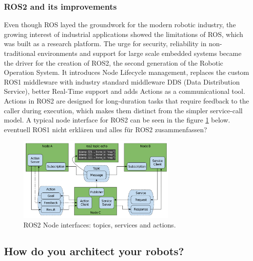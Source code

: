 \documentclass[]{article}
\begin{document}
	\subsubsection{ROS2 and its improvements}
	Even though ROS layed the groundwork for the modern robotic industry, the growing interest of industrial applications showed the limitations of ROS, which was built as a research platform. The urge for security, reliability in non-traditional environments and support for large scale embedded systems became the driver for the creation of ROS2, the second generation of the Robotic Operation System. \autocite{macenskiRobotOperatingSystem2022} 
	It introduces Node Lifecycle management, replaces the custom ROS1 middleware with industry standard middleware DDS (Data Distribution Service), better Real-Time support and adds Actions as a communicational tool. Actions in ROS2 are designed for long-duration tasks that require feedback to the caller during execution, which makes them distinct from the simpler service-call model.  \autocite{macenskiRobotOperatingSystem2022} A typical node interface for ROS2 can be seen in the figure \ref{fig: fig5} below. 
	{\color{red} eventuell ROS1 nicht erklären und alles für ROS2 zusammenfassen? }
	
	\begin{figure}[ht]
		\centering
		\includegraphics[width=0.7\textwidth]{Graphics/ROS2}
		\caption{ROS2 Node interfaces: topics, services and actions. \autocite{macenskiRobotOperatingSystem2022}}
		\label{fig: fig5}
	\end{figure}
	
	\subsection{How do you architect your robots?}
\end{document}
